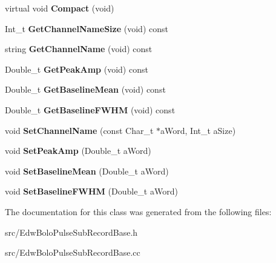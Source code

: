 \begin{DoxyCompactItemize}
\item 
\hypertarget{class_edw_bolo_pulse_sub_record_base_a2a132bb717f391aad11baa7cc5c3833a}{
virtual void {\bfseries Compact} (void)}
\label{class_edw_bolo_pulse_sub_record_base_a2a132bb717f391aad11baa7cc5c3833a}

\item 
\hypertarget{class_edw_bolo_pulse_sub_record_base_a1ef0b067be7c33e6cb7062b2fa9e091e}{
Int\_\-t {\bfseries GetChannelNameSize} (void) const }
\label{class_edw_bolo_pulse_sub_record_base_a1ef0b067be7c33e6cb7062b2fa9e091e}

\item 
\hypertarget{class_edw_bolo_pulse_sub_record_base_a87a874721df67be37f943b5945960f7d}{
string {\bfseries GetChannelName} (void) const }
\label{class_edw_bolo_pulse_sub_record_base_a87a874721df67be37f943b5945960f7d}

\item 
\hypertarget{class_edw_bolo_pulse_sub_record_base_abc31891af7881a7874ca7786298329cb}{
Double\_\-t {\bfseries GetPeakAmp} (void) const }
\label{class_edw_bolo_pulse_sub_record_base_abc31891af7881a7874ca7786298329cb}

\item 
\hypertarget{class_edw_bolo_pulse_sub_record_base_af4ec94870845f4632176d3fc4e91d190}{
Double\_\-t {\bfseries GetBaselineMean} (void) const }
\label{class_edw_bolo_pulse_sub_record_base_af4ec94870845f4632176d3fc4e91d190}

\item 
\hypertarget{class_edw_bolo_pulse_sub_record_base_af23a2db21907cc459c1d88be7aac3861}{
Double\_\-t {\bfseries GetBaselineFWHM} (void) const }
\label{class_edw_bolo_pulse_sub_record_base_af23a2db21907cc459c1d88be7aac3861}

\item 
\hypertarget{class_edw_bolo_pulse_sub_record_base_aec14c82e3bed8679845ef46e8012474c}{
void {\bfseries SetChannelName} (const Char\_\-t $\ast$aWord, Int\_\-t aSize)}
\label{class_edw_bolo_pulse_sub_record_base_aec14c82e3bed8679845ef46e8012474c}

\item 
\hypertarget{class_edw_bolo_pulse_sub_record_base_abc1653c15520ddf39528d8a9b68d17a4}{
void {\bfseries SetPeakAmp} (Double\_\-t aWord)}
\label{class_edw_bolo_pulse_sub_record_base_abc1653c15520ddf39528d8a9b68d17a4}

\item 
\hypertarget{class_edw_bolo_pulse_sub_record_base_a9c2897d5c75237315e0a1dc8449c1d87}{
void {\bfseries SetBaselineMean} (Double\_\-t aWord)}
\label{class_edw_bolo_pulse_sub_record_base_a9c2897d5c75237315e0a1dc8449c1d87}

\item 
\hypertarget{class_edw_bolo_pulse_sub_record_base_a8a4a00d995c459bdfe2c73590b764e28}{
void {\bfseries SetBaselineFWHM} (Double\_\-t aWord)}
\label{class_edw_bolo_pulse_sub_record_base_a8a4a00d995c459bdfe2c73590b764e28}

\end{DoxyCompactItemize}


The documentation for this class was generated from the following files:\begin{DoxyCompactItemize}
\item 
src/EdwBoloPulseSubRecordBase.h\item 
src/EdwBoloPulseSubRecordBase.cc\end{DoxyCompactItemize}
